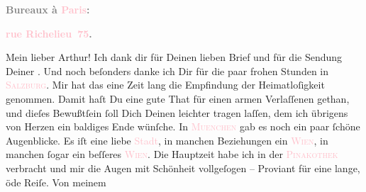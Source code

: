            \pstart
           \begin{otherlanguage}{french}\textcolor{gray}{\textbf{\textbf{Bureaux à \textcolor{pink}{Paris}{}\ledrightnote{\textcolor{pink}{Paris}}:}}}\end{otherlanguage}\pend
           \pstart
           \begin{otherlanguage}{french}\textcolor{gray}{\textbf{\textbf{\textcolor{pink}{rue Richelieu 75}{}\ledrightnote{\textcolor{pink}{rue Richelieu}}.}}}\end{otherlanguage}\pend
           \pstart\center{}Mein lieber Arthur!\pend\pstart
           Ich dank dir für Deinen lieben Brief und für die Sendung Deiner \label{K_L02717-5v}\label{K_L02717-5h}. Und noch beſonders danke ich Dir für
               die paar frohen Stunden in \textsc{\textcolor{pink}{Salzburg}{}\ledrightnote{\textcolor{pink}{Salzburg}}}. Mir hat das eine Zeit lang die Empfindung der Heimatloſigkeit genommen. Damit
               haſt Du eine gute That für einen \strikeout{\textcolor{gray}{ar}} armen Verlaſſenen gethan, und dieſes Bewußtſein ſoll Dich Deinen \label{K_L02717-1v}\label{K_L02717-1h}
               leichter tragen laſſen, dem ich übrigens von Herzen ein baldiges Ende wünſche.\pend
           \pstart
           In \textsc{\textcolor{pink}{Muenchen}{}\ledrightnote{\textcolor{pink}{München}}} gab es noch ein paar ſchöne Augenblicke. Es iſt eine liebe \textcolor{pink}{Stadt}{}, in {\pb}manchen Beziehungen ein \textcolor{pink}{\textsc{Wien}}{}\ledrightnote{\textcolor{pink}{Wien}}, in manchen ſogar ein beſſeres \textcolor{pink}{\textsc{Wien}}{}\ledrightnote{\textcolor{pink}{Wien}}. Die Hauptzeit habe ich in der \textcolor{pink}{\textsc{Pinakothek}}{} verbracht und mir die Augen mit Schönheit vollgeſogen – Proviant für eine
               lange, öde Reiſe.  Von meinem
